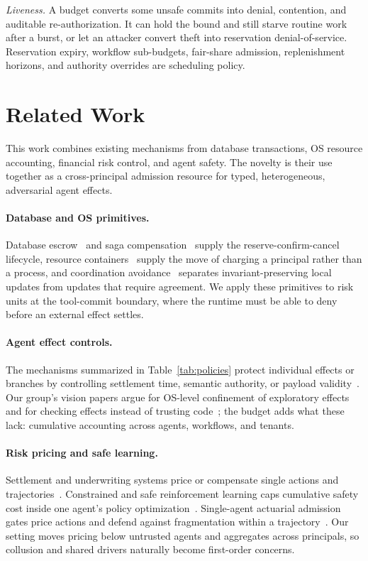 \documentclass[sigconf]{acmart}
\begin{document}
\emph{Liveness.} A budget converts some unsafe commits into denial, contention, and auditable re-authorization. It can hold the bound and still starve routine work after a burst, or let an attacker convert theft into reservation denial-of-service. Reservation expiry, workflow sub-budgets, fair-share admission, replenishment horizons, and authority overrides are scheduling policy.

\section{Related Work}
\label{sec:related}
This work combines existing mechanisms from database transactions, OS resource accounting, financial risk control, and agent safety. The novelty is their use together as a cross-principal admission resource for typed, heterogeneous, adversarial agent effects.

\paragraph{Database and OS primitives.} Database escrow~\cite{ONeil1986Escrow} and saga compensation~\cite{GarciaMolina1987Sagas,Helland2007LifeBeyond} supply the reserve-confirm-cancel lifecycle, resource containers~\cite{Banga1999ResourceContainers} supply the move of charging a principal rather than a process, and coordination avoidance~\cite{Hellerstein2020CALM,Bailis2014Coordination} separates invariant-preserving local updates from updates that require agreement. We apply these primitives to risk units at the tool-commit boundary, where the runtime must be able to deny before an external effect settles.

\paragraph{Agent effect controls.} The mechanisms summarized in Table~\ref{tab:policies} protect individual effects or branches by controlling settlement time, semantic authority, or payload validity~\cite{Mohammadi2026Atomix,Chen2026Cordon,OWASP2025AgenticThreats}. Our group's vision papers argue for OS-level confinement of exploratory effects~\cite{Hu2026ExternalizationBarriers} and for checking effects instead of trusting code~\cite{Hu2026DontTrust}; the budget adds what these lack: cumulative accounting across agents, workflows, and tenants.

\paragraph{Risk pricing and safe learning.} Settlement and underwriting systems price or compensate single actions and trajectories~\cite{Hua2026ARS,Xu2026TraceEconomic}. Constrained and safe reinforcement learning caps cumulative safety cost inside one agent's policy optimization~\cite{Achiam2017CPO}. Single-agent actuarial admission gates price actions and defend against fragmentation within a trajectory~\cite{Chen2026AAI}. Our setting moves pricing below untrusted agents and aggregates across principals, so collusion and shared drivers naturally become first-order concerns.
\end{document}
